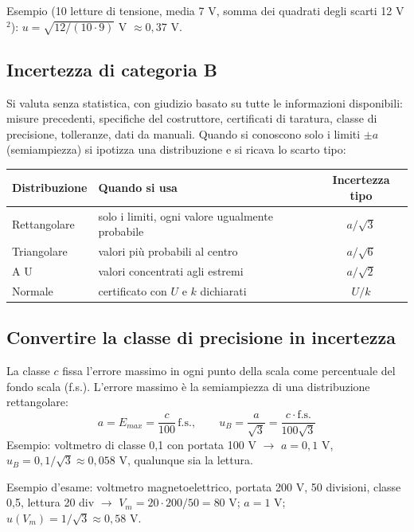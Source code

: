 \documentclass[11pt,a4paper]{article}
\begin{document}
Esempio (10 letture di tensione, media 7 V, somma dei quadrati degli scarti 12 V$^2$): $u = \sqrt{12/(10\cdot 9)}$ V $\approx 0{,}37$ V.

\subsection*{Incertezza di categoria B}

Si valuta senza statistica, con giudizio basato su tutte le informazioni disponibili: misure precedenti, specifiche del costruttore, certificati di taratura, classe di precisione, tolleranze, dati da manuali. Quando si conoscono solo i limiti $\pm a$ (semiampiezza) si ipotizza una distribuzione e si ricava lo scarto tipo:

\begin{center}
\begin{tabularx}{\linewidth}{l L c}
\toprule
\textbf{Distribuzione} & \textbf{Quando si usa} & \textbf{Incertezza tipo}\\
\midrule
Rettangolare & solo i limiti, ogni valore ugualmente probabile & $a/\sqrt{3}$\\
Triangolare & valori più probabili al centro & $a/\sqrt{6}$\\
A U & valori concentrati agli estremi & $a/\sqrt{2}$\\
Normale & certificato con $U$ e $k$ dichiarati & $U/k$\\
\bottomrule
\end{tabularx}
\end{center}

\subsection*{Convertire la classe di precisione in incertezza}

La classe $c$ fissa l'errore massimo in ogni punto della scala come percentuale del fondo scala (f.s.). L'errore massimo è la semiampiezza di una distribuzione rettangolare:
\[
a = E_{max} = \frac{c}{100}\,\mathrm{f.s.}, \qquad u_B = \frac{a}{\sqrt{3}} = \frac{c \cdot \mathrm{f.s.}}{100\sqrt{3}}
\]
Esempio: voltmetro di classe 0,1 con portata 100 V $\rightarrow$ $a = 0{,}1$ V, $u_B = 0{,}1/\sqrt{3} \approx 0{,}058$ V, qualunque sia la lettura.

Esempio d'esame: voltmetro magnetoelettrico, portata 200 V, 50 divisioni, classe 0,5, lettura 20 div $\rightarrow$ $V_m = 20\cdot200/50 = 80$ V; $a = 1$ V; $u(V_m) = 1/\sqrt{3} \approx 0{,}58$ V.
\end{document}
